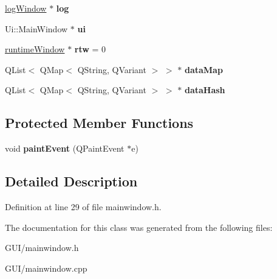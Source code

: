 \begin{DoxyCompactItemize}
\hyperlink{classlog_window}{log\+Window} $\ast$ {\bfseries log}
\item 
\mbox{\label{class_main_window_a35466a70ed47252a0191168126a352a5}} 
Ui\+::\+Main\+Window $\ast$ {\bfseries ui}
\item 
\mbox{\label{class_main_window_a0f96bb106df51962a8df7f1cf2754600}} 
\hyperlink{classruntime_window}{runtime\+Window} $\ast$ {\bfseries rtw} = 0
\item 
\mbox{\label{class_main_window_a3fbe757557ba3315d9614ad89fdc18cc}} 
Q\+List$<$ Q\+Map$<$ Q\+String, Q\+Variant $>$ $>$ $\ast$ {\bfseries data\+Map}
\item 
\mbox{\label{class_main_window_a6dd509c351aba598db55100798995924}} 
Q\+List$<$ Q\+Map$<$ Q\+String, Q\+Variant $>$ $>$ $\ast$ {\bfseries data\+Hash}
\end{DoxyCompactItemize}
\subsection*{Protected Member Functions}
\begin{DoxyCompactItemize}
\item 
\mbox{\label{class_main_window_a7d17315ad42e624c7960b0c93fe4f0b9}} 
void {\bfseries paint\+Event} (Q\+Paint\+Event $\ast$e)
\end{DoxyCompactItemize}


\subsection{Detailed Description}


Definition at line 29 of file mainwindow.\+h.



The documentation for this class was generated from the following files\+:\begin{DoxyCompactItemize}
\item 
G\+U\+I/mainwindow.\+h\item 
G\+U\+I/mainwindow.\+cpp\end{DoxyCompactItemize}
